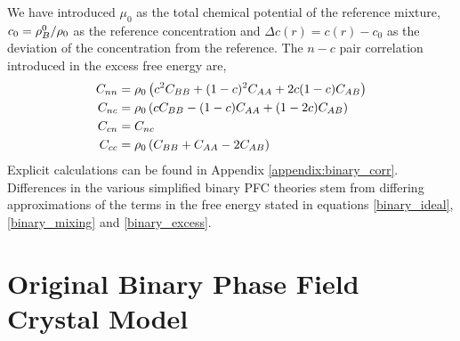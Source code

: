 %
We have introduced $\mu_0$ as the total chemical potential of the reference
mixture, $c_0 = \rho_B^0 / \rho_0$ as the reference concentration and $\Delta c(r)
= c(r) - c_0$ as the deviation of the concentration from the reference.  The
$n-c$ pair correlation introduced in the excess free energy are,
%
\begin{align}
    C_{nn} &= \rho_0\left(c^2 C_{BB} + (1 - c)^2C_{AA} + 2c(1-c)C_{AB}\right) \\
    C_{nc} &= \rho_0\left(c C_{BB} - (1 - c) C_{AA} + (1 - 2c)C_{AB}\right) \\
    C_{cn} &= C_{nc} \\
    C_{cc} &= \rho_0\left(C_{BB} + C_{AA} - 2 C_{AB}\right)
\end{align}
%
Explicit calculations can be found in Appendix \ref{appendix:binary_corr}.
Differences in the various simplified binary PFC theories stem from differing
approximations of the terms in the free energy stated in equations 
\ref{binary_ideal}, \ref{binary_mixing} and \ref{binary_excess}.

\section{Original Binary Phase Field Crystal Model} %

